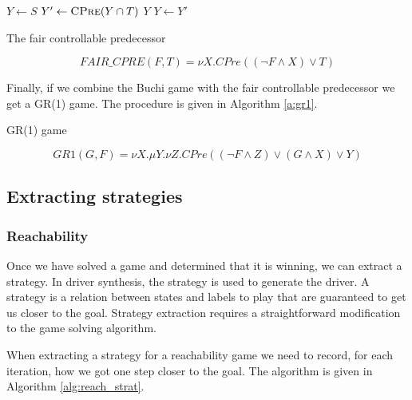 \begin{algorithm}[t]
\begin{algorithmic}
\State $Y \gets S$
\Loop
\State $Y' \gets \Call{CPre}{Y \cap T}$
\State\Return $Y$\EndIf
\State $Y \gets Y'$
\EndLoop
\EndFunction
\end{algorithmic}
\caption{The fair controllable predecessor}
\label{a:fair_cpre}
\end{algorithm}

\begin{equation}
FAIR\_CPRE(F, T) = \nu X. CPre((\neg F \wedge X) \vee T)
\label{eqn:mu_fair}
\end{equation}

Finally, if we combine the Buchi game with the fair controllable predecessor we get a GR(1) game. The procedure is given in Algorithm \ref{a:gr1}.

\begin{algorithm}[t]
\begin{algorithmic}
\State\Return {}
\EndFunction
\end{algorithmic}
\caption{GR(1) game}
\label{a:gr1}
\end{algorithm}

\begin{equation}
GR1(G, F) = \nu X. \mu Y. \nu Z. CPre((\neg F \wedge Z) \vee (G \wedge X) \vee Y)
\label{equ:mu_gr1}
\end{equation}

\subsection{Extracting strategies}

\subsubsection{Reachability}

Once we have solved a game and determined that it is winning, we can extract a strategy. In driver synthesis, the strategy is used to generate the driver. A strategy is a relation between states and labels to play that are guaranteed to get us closer to the goal. Strategy extraction requires a straightforward modification to the game solving algorithm.

When extracting a strategy for a reachability game we need to record, for each iteration, how we got one step closer to the goal. The algorithm is given in Algorithm \ref{alg:reach_strat}. 

